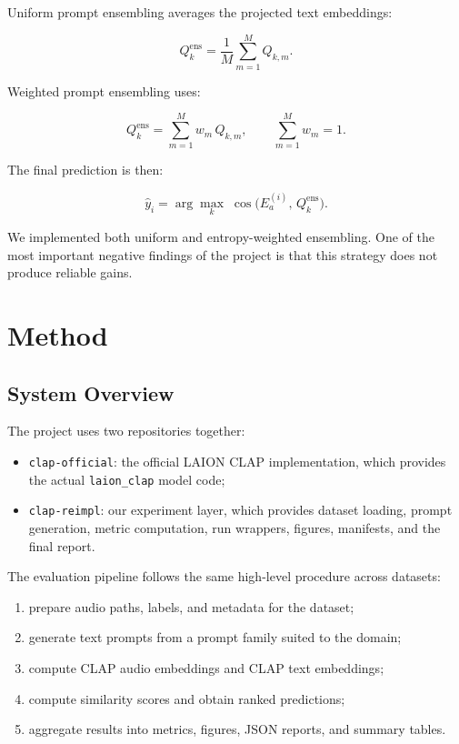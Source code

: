 \documentclass[11pt]{article}
\newcommand{\dataset}[1]{\texttt{#1}}
\begin{document}
Uniform prompt ensembling averages the projected text embeddings:

\begin{equation}
Q_k^{\text{ens}} = \frac{1}{M} \sum_{m=1}^{M} Q_{k,m}.
\end{equation}

Weighted prompt ensembling uses:

\begin{equation}
Q_k^{\text{ens}} = \sum_{m=1}^{M} w_m\, Q_{k,m},
\qquad \sum_{m=1}^{M} w_m = 1.
\end{equation}

The final prediction is then:

\begin{equation}
\hat{y}_i = \arg\max_k \;\cos\!\bigl(E_a^{(i)},\, Q_k^{\text{ens}}\bigr).
\end{equation}

We implemented both uniform and entropy-weighted ensembling. One of the most
important negative findings of the project is that this strategy does not
produce reliable gains.

\section{Method}

\subsection{System Overview}

The project uses two repositories together:
\begin{itemize}[leftmargin=1.25em]
  \item \dataset{clap-official}:
  the official LAION CLAP implementation, which provides the actual
  \dataset{laion\_clap} model code;
  \item \dataset{clap-reimpl}:
  our experiment layer, which provides dataset loading, prompt generation,
  metric computation, run wrappers, figures, manifests, and the final report.
\end{itemize}

The evaluation pipeline follows the same high-level procedure across datasets:
\begin{enumerate}[leftmargin=1.4em]
  \item prepare audio paths, labels, and metadata for the dataset;
  \item generate text prompts from a prompt family suited to the domain;
  \item compute CLAP audio embeddings and CLAP text embeddings;
  \item compute similarity scores and obtain ranked predictions;
  \item aggregate results into metrics, figures, JSON reports, and summary
  tables.
\end{enumerate}
\end{document}
